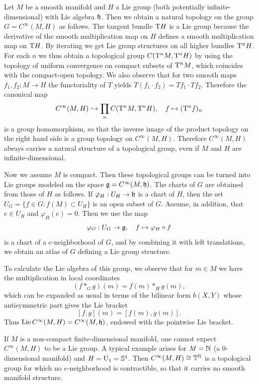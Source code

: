 \begin{example}
    Let $M$ be a smooth manifold and $H$ a Lie group (both potentially infinite-dimensional) with Lie algebra $\mathfrak{h}$. Then we obtain a natural topology on the group $G=C^\infty(M,H)$ as follows. The tangent bundle $\mathrm{T} H$ is a Lie group because the derivative of the smooth  multiplication map on $H$ defines a smooth multiplication map on $\mathrm{T} H$. By iterating we get Lie group structures on all higher bundles $\mathrm{T}^n H$. For each $n$ we thus obtain a topological group $C(\mathrm{T}^nM,\mathrm{T}^nH)$ by using the topology of uniform convergence on compact subsets of $\mathrm{T}^nM$, which coincides with the compact-open topology. We also observe that for two smooth maps $f_1,f_2:M\to H$ the functoriality of $T$ yields $T(f_1\cdot f_2)=Tf_1\cdot Tf_2.$ Therefore the canonical map
    \[C^\infty(M,H)\hookrightarrow \prod_{n}C(\mathrm{T}^nM,\mathrm{T}^nH),\quad f\mapsto (\mathrm{T}^nf)_n\]
    is a group homomorphism, so that the inverse image of the product topology on the right hand side is a group topology on $C^\infty(M,H)$. Therefore $C^\infty(M,H)$ always carries a natural structure of a topological group, even if $M$ and $H$ are infinite-dimensional.

    Now we assume $M$ is compact. Then these topological groups can be turned into Lie groups modeled on the space $\mathfrak{g}=C^\infty(M,\mathfrak{h})$. The charts of $G$ are obtained from those of $H$ as follows. If $\varphi_H:U_H\to \mathfrak{h}$ is a chart of $H$, then the set $U_G=\{f\in G:f(M)\subset U_H\}$ is an open subset of $G$. Assume, in addition, that $e\in U_H$ and $\varphi_H(e)=0$. Then we use the map 
    \[\varphi_G:U_G\to\mathfrak{g},\quad f\mapsto \varphi_H\circ f\]
    is a chart of a $e$-neighborhood of $G$, and by combining it with left translations, we obtain an atlas of $G$ defining a Lie group structure.

    To calculate the Lie algebra of this group, we observe that for $m\in M$ we have the multiplication in local coordinates
    \[(f\ast_G g)(m)=f(m)\ast_H g(m),\]
    which can be expanded as usual in terms of the bilinear form $b(X,Y)$ whose antisymmetric part gives the Lie bracket
    \[[f,g](m)=[f(m),g(m)].\]
    Thus $\operatorname{Lie} C^\infty(M,H)=C^\infty(M,\mathfrak{h})$, endowed with the pointwise Lie bracket.
\end{example}

\begin{rem}
    If $M$ is a non-compact finite-dimensional manifold, one cannot expect $C^\infty(M,H)$ to be a Lie group. A typical example arises for $M=\mathbb{N}$ (a $0$-dimensional manifold) and $H=\operatorname{U}_1=\mathbb{S}^1$. Then $C^\infty(M,H)\cong \mathbb{T}^{\mathbb{N}}$ is a topological group for which no $e$-neighborhood is contractible, so that it carries no smooth manifold structure.
\end{rem}

